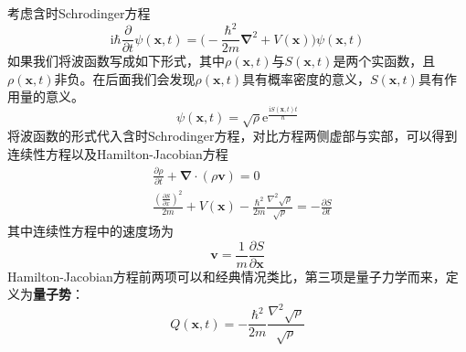         考虑含时Schrodinger方程
        \begin{equation*}
            \mathrm{i}\hbar \frac {\partial}{\partial t} \psi(\bm{x},t) = \bigg( - \frac {\hbar^2}{2m}\bm{\nabla}^2 + V(\bm{x})\bigg) \psi(\bm{x},t)
        \end{equation*}
        如果我们将波函数写成如下形式，其中$\rho(\bm{x},t)$与$S(\bm{x},t)$是两个实函数，且$\rho(\bm{x},t)$非负。在后面我们会发现$\rho(\bm{x},t)$具有概率密度的意义，$S(\bm{x},t)$具有作用量的意义。
        \begin{equation*}
            \psi(\bm{x},t) = \sqrt{\rho} \mathrm{e}^{\frac {\mathrm{i}S(\bm{x},t)t}{\hbar}}
        \end{equation*}
        将波函数的形式代入含时Schrodinger方程，对比方程两侧虚部与实部，可以得到连续性方程以及Hamilton-Jacobian方程
        \begin{align*}
            &\frac {\partial \rho}{\partial t} + \bm{\nabla} \cdot (\rho \bm{v}) = 0 \\
            &\frac {(\frac {\partial S}{\partial x})^2}{2m} + V(\bm{x}) - \frac {\hbar^2}{2m} \frac {\nabla^2 \sqrt{\rho}}{\sqrt{\rho}} = -\frac {\partial S}{\partial t}
        \end{align*}
        其中连续性方程中的速度场为
        \begin{equation*}
            \bm{v} = \frac 1m \frac {\partial S}{\partial \bm{x}}
        \end{equation*}
        Hamilton-Jacobian方程前两项可以和经典情况类比，第三项是量子力学而来，定义为\textbf{量子势}：
        \begin{equation*}
            Q(\bm{x},t) = - \frac {\hbar^2}{2m} \frac {\nabla^2 \sqrt{\rho}}{\sqrt{\rho}}
        \end{equation*}

